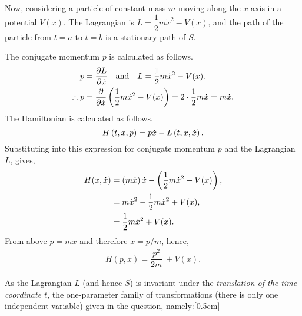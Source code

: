 \begin{comment}
For (e), it is the case that xi=0, tau=1 (or at least tau=constant), but it's not to do with the fact that the motion is one-dimensional. Look at where xi and tau come from and note that specifically part (e) says that L is invariant 'under translation of t'. That's the best hint I can give, I think.
\end{comment}
Now, considering a particle of constant mass $m$ moving along the $x$-axis in a potential $V(x)$. The Lagrangian is $L=\dfrac{1}{2}m\dot{x}^2 - V(x)$, and the path of the particle from $t=a$ to $t=b$ is a stationary path of $S$.

The conjugate momentum $p$ is calculated as follows.
\begin{align*}
	p &= \frac{\partial L}{\partial \dot{x}}\quad\text{and}\quad L=\dfrac{1}{2}m\dot{x}^2 - V(x).\\
	\therefore p&=\frac{\partial }{\partial \dot{x}}\left(\dfrac{1}{2}m\dot{x}^2 - V(x)\right) = 2\cdot\frac{1}{2} m\dot{x} = m\dot{x}.
\end{align*}
The Hamiltonian is calculated as follows.
\[
	H\left(t,x,p\right)=p\dot{x}-L\left(t,x,\dot{x}\right).
\]
Substituting into this expression for conjugate momentum $p$ and the Lagrangian $L$, gives,
\begin{align*}
	H(x,\dot{x}) &= \left(m\dot{x}\right)\dot{x} - \left(\dfrac{1}{2}m\dot{x}^2 - V(x)\right),\\
	&=m\dot{x}^2 - \dfrac{1}{2}m\dot{x}^2 + V(x),\\
	&=\dfrac{1}{2}m\dot{x}^2 + V(x).
\end{align*}
From above $p=m\dot{x}$ and therefore $\dot{x}=p/m$, hence,
\begin{align}
\label{eq:5.25}
	\boxed{H(p,x)=\dfrac{p^2}{2m}\ + V(x).}
\end{align}
\begin{comment}
	If the Lagrangian does not depend explicitly on time, then the Hamiltonian, too, does not depend explicitly on time.
	For example,  V(x)=1/2kx2 , has no explicit time dependence ( ∂V/∂t=0 ) even though  x  will change with time 
\end{comment}
As the Lagrangian $L$ (and hence $S$) is invariant under the \textit{translation of the time coordinate $t$}, the one-parameter family of transformations (there is only one independent variable) given in the question, namely:[0.5cm]
